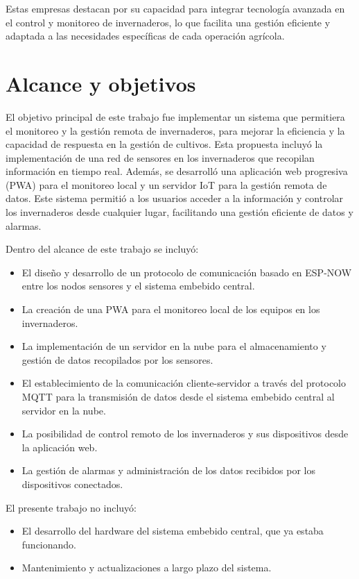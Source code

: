 Estas empresas destacan por su capacidad para integrar tecnología avanzada en el control y monitoreo de invernaderos, lo que facilita una gestión eficiente y adaptada a las necesidades específicas de cada operación agrícola.




\section{Alcance y objetivos}

El objetivo principal de este trabajo fue implementar un sistema que permitiera el monitoreo y la gestión remota de invernaderos, para mejorar la eficiencia y la capacidad de respuesta en la gestión de cultivos. Esta propuesta incluyó la implementación de una red de sensores en los invernaderos que recopilan información en tiempo real. Además, se desarrolló una aplicación web progresiva (PWA) para el monitoreo local y un servidor IoT para la gestión remota de datos. Este sistema permitió a los usuarios acceder a la información y controlar los invernaderos desde cualquier lugar, facilitando una gestión eficiente de datos y alarmas.

Dentro del alcance de este trabajo se incluyó:
\begin{itemize}
	\item El diseño y desarrollo de un protocolo de comunicación basado en ESP-NOW entre los nodos sensores y el sistema embebido central.
	\item La creación de una PWA para el monitoreo local de los equipos en los invernaderos.
	\item La implementación de un servidor en la nube para el almacenamiento y gestión de datos recopilados por los sensores.
	\item El establecimiento de la comunicación cliente-servidor a través del protocolo MQTT para la transmisión de datos desde el sistema embebido central al servidor en la nube.
	\item La posibilidad de control remoto de los invernaderos y sus dispositivos desde la aplicación web.
	\item La gestión de alarmas y administración de los datos recibidos por los dispositivos conectados.
\end{itemize}

El presente trabajo no incluyó:

\begin{itemize}
	\item El desarrollo del hardware del sistema embebido central, que ya estaba funcionando.
	\item Mantenimiento y actualizaciones a largo plazo del sistema.
\end{itemize}



